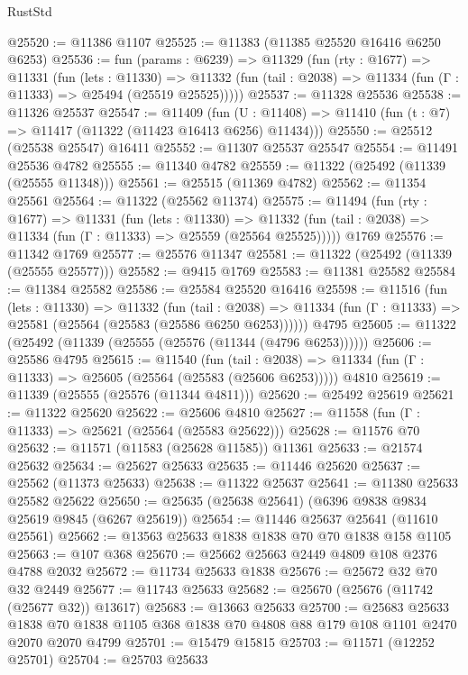 \begin{lexlean}{RustStd}
\begin{coremodule}
@25520 := @11386 @1107
@25525 := @11383 (@11385 @25520 @16416 @6250 @6253)
@25536 := fun (params : @6239) =>
  @11329
    (fun (rty : @1677) =>
    @11331
      (fun (lets : @11330) =>
      @11332 (fun (tail : @2038) => @11334 (fun (Γ : @11333) => @25494 (@25519 @25525)))))
@25537 := @11328 @25536
@25538 := @11326 @25537
@25547 := @11409
    (fun (U : @11408) => @11410 (fun (t : @7) => @11417 (@11322 (@11423 @16413 @6256) @11434)))
@25550 := @25512 (@25538 @25547) @16411
@25552 := @11307 @25537 @25547
@25554 := @11491 @25536 @4782
@25555 := @11340 @4782
@25559 := @11322 (@25492 (@11339 (@25555 @11348)))
@25561 := @25515 (@11369 @4782)
@25562 := @11354 @25561
@25564 := @11322 (@25562 @11374)
@25575 := @11494
    (fun (rty : @1677) =>
    @11331
      (fun (lets : @11330) =>
      @11332 (fun (tail : @2038) => @11334 (fun (Γ : @11333) => @25559 (@25564 @25525)))))
    @1769
@25576 := @11342 @1769
@25577 := @25576 @11347
@25581 := @11322 (@25492 (@11339 (@25555 @25577)))
@25582 := @9415 @1769
@25583 := @11381 @25582
@25584 := @11384 @25582
@25586 := @25584 @25520 @16416
@25598 := @11516
    (fun (lets : @11330) =>
    @11332
      (fun (tail : @2038) =>
      @11334 (fun (Γ : @11333) => @25581 (@25564 (@25583 (@25586 @6250 @6253))))))
    @4795
@25605 := @11322 (@25492 (@11339 (@25555 (@25576 (@11344 (@4796 @6253))))))
@25606 := @25586 @4795
@25615 := @11540
    (fun (tail : @2038) => @11334 (fun (Γ : @11333) => @25605 (@25564 (@25583 (@25606 @6253)))))
    @4810
@25619 := @11339 (@25555 (@25576 (@11344 @4811)))
@25620 := @25492 @25619
@25621 := @11322 @25620
@25622 := @25606 @4810
@25627 := @11558 (fun (Γ : @11333) => @25621 (@25564 (@25583 @25622)))
@25628 := @11576 @70
@25632 := @11571 (@11583 (@25628 @11585)) @11361
@25633 := @21574 @25632
@25634 := @25627 @25633
@25635 := @11446 @25620
@25637 := @25562 (@11373 @25633)
@25638 := @11322 @25637
@25641 := @11380 @25633 @25582 @25622
@25650 := @25635 (@25638 @25641) (@6396 @9838 @9834 @25619 @9845 (@6267 @25619))
@25654 := @11446 @25637 @25641 (@11610 @25561)
@25662 := @13563 @25633 @1838 @1838 @70 @70 @1838 @158 @1105
@25663 := @107 @368
@25670 := @25662 @25663 @2449 @4809 @108 @2376 @4788 @2032
@25672 := @11734 @25633 @1838
@25676 := @25672 @32 @70 @32 @2449
@25677 := @11743 @25633
@25682 := @25670 (@25676 (@11742 (@25677 @32)) @13617)
@25683 := @13663 @25633
@25700 := @25683
    @25633
    @1838
    @70
    @1838
    @1105
    @368
    @1838
    @70
    @4808
    @88
    @179
    @108
    @1101
    @2470
    @2070
    @2070
    @4799
@25701 := @15479 @15815
@25703 := @11571 (@12252 @25701)
@25704 := @25703 @25633

\end{coremodule}
\end{lexlean}
